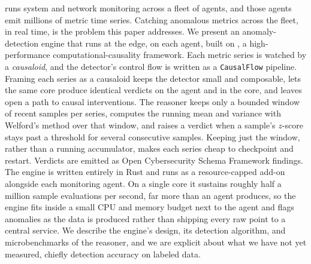 \sysname runs system and network monitoring across a fleet of agents, and those
agents emit millions of metric time series. Catching anomalous metrics across the
fleet, in real time, is the problem this paper addresses. We present an
anomaly-detection engine that runs at the edge, on each agent, built on \dc{}, a
high-performance computational-causality framework. Each metric series is watched
by a \emph{causaloid}, and the detector's control flow is written as a \dc{}
\texttt{CausalFlow} pipeline. Framing each series as a causaloid keeps the detector
small and composable, lets the same core produce identical verdicts on the agent
and in the core, and leaves open a path to causal interventions. The reasoner keeps
only a bounded window of recent
samples per series, computes the running mean and variance with Welford's method
over that window, and raises a verdict when a sample's $z$-score stays past a
threshold for several consecutive samples. Keeping just the window, rather than a
running accumulator, makes each series cheap to checkpoint and restart. Verdicts
are emitted as Open Cybersecurity Schema Framework findings. The engine is written
entirely in Rust and runs as a resource-capped add-on alongside each monitoring
agent. On a single core it sustains roughly half a million sample evaluations per
second, far more than an agent produces, so the engine fits inside a small CPU and
memory budget next to the agent and flags anomalies as the data is produced rather
than shipping every raw point to a central service. We describe the engine's
design, its detection algorithm, and microbenchmarks of the reasoner, and we are
explicit about what we have not yet measured, chiefly detection accuracy on
labeled data.
